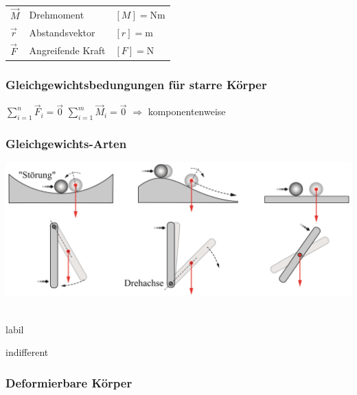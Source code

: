 	
	
	
	\begin{tabular}{lll}
	$\vec{M}$ & Drehmoment & $[M] = \mathrm{Nm}$ \\
	$\vec{r}$ & Abstandsvektor & $[r] = \mathrm{m}$ \\
	$\vec{F}$ & Angreifende Kraft & $[F] = \mathrm{N}$ \\
	\end{tabular}

		
		
		
		
	\subsubsection{Gleichgewichtsbedungungen für starre Körper}
		
	$ \sum \limits_{i = 1}^n \vec{F}_i = \vec{0}$  \qquad  $ \sum \limits_{i = 1}^m \vec{M}_i = \vec{0} $  \qquad $\Rightarrow$ komponentenweise
		
		
		
	\subsubsection{Gleichgewichts-Arten}	
	\includegraphics[width=0.95\linewidth]{Bilder/gleichgewichte} \\
	\\
	
	
	\begin{minipage}{0.3\linewidth}
	\end{minipage}
	\hfill
	\begin{minipage}{0.3\linewidth}
	labil
	\end{minipage}
	\hfill
	\begin{minipage}{0.3\linewidth}
	indifferent
	\end{minipage}

	

		
	\subsubsection{Deformierbare Körper}
		
